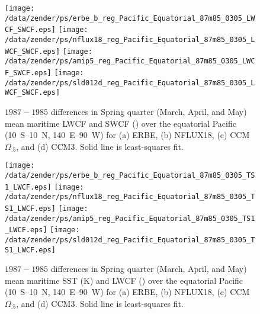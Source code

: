 \documentclass[twocolumn,final,11pt]{article}
\begin{document}
\begin{sidewaysfigure}
\begin{center}
\texttt{[image: /data/zender/ps/erbe\_b\_reg\_Pacific\_Equatorial\_87m85\_0305\_LWCF\_SWCF.eps]}%
\texttt{[image: /data/zender/ps/nflux18\_reg\_Pacific\_Equatorial\_87m85\_0305\_LWCF\_SWCF.eps]}%
\texttt{[image: /data/zender/ps/amip5\_reg\_Pacific\_Equatorial\_87m85\_0305\_LWCF\_SWCF.eps]}%
\texttt{[image: /data/zender/ps/sld012d\_reg\_Pacific\_Equatorial\_87m85\_0305\_LWCF\_SWCF.eps]}%
\end{center}
\caption[$1987-1985$ differences in Spring quarter (March, April, and
May) mean maritime LWCF and SWCF over the equatorial Pacific for ERBE,
NFLUX18, CCM$\Omega_{.5}$, and CCM3]{ 
$1987-1985$ differences in Spring quarter (March, April, and May) 
mean maritime LWCF and SWCF (\wxmS) over the equatorial Pacific 
(10~\degreee S--10~\degreee N, 140~\degreee E--90~\degreee W)
for (a) ERBE, (b) NFLUX18, (c) CCM$\Omega_{.5}$, and (d) CCM3.
Solid line is least-squares fit.
\label{fig:reg_Pacific_Equatorial_87m85_0305_LWCF_SWCF}}   
\end{sidewaysfigure}

\begin{sidewaysfigure}
\begin{center}
\texttt{[image: /data/zender/ps/erbe\_b\_reg\_Pacific\_Equatorial\_87m85\_0305\_TS1\_LWCF.eps]}%
\texttt{[image: /data/zender/ps/nflux18\_reg\_Pacific\_Equatorial\_87m85\_0305\_TS1\_LWCF.eps]}%
\texttt{[image: /data/zender/ps/amip5\_reg\_Pacific\_Equatorial\_87m85\_0305\_TS1\_LWCF.eps]}%
\texttt{[image: /data/zender/ps/sld012d\_reg\_Pacific\_Equatorial\_87m85\_0305\_TS1\_LWCF.eps]}%
\end{center}
\caption[$1987-1985$ differences in Spring quarter (March, April, and May)
mean maritime SST and LWCF over the equatorial Pacific for ERBE, NFLUX18, CCM$\Omega_{.5}$,
and CCM3]{ 
$1987-1985$ differences in Spring quarter (March, April, and May)
mean maritime SST (\degreee K) and LWCF (\wxmS) over the equatorial
Pacific  (10~\degreee S--10~\degreee N, 140~\degreee E--90~\degreee W)
for (a) ERBE, (b) NFLUX18, (c) CCM$\Omega_{.5}$, and (d) CCM3.
Solid line is least-squares fit.
\label{fig:reg_Pacific_Equatorial_87m85_0305_TS1_LWCF}}   
\end{sidewaysfigure}
\end{document}
